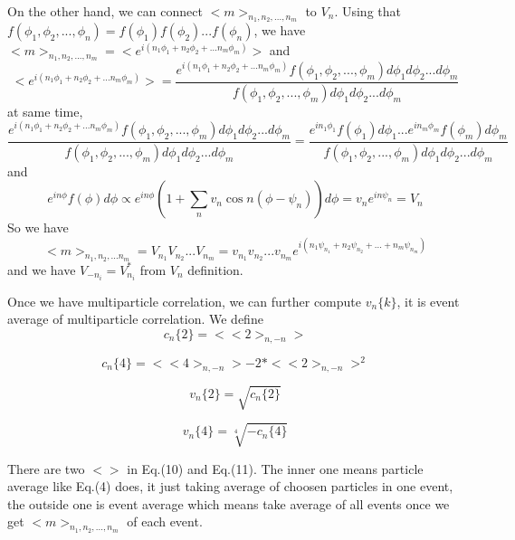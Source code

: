 \documentclass{article}
\begin{document}
\quad On the other hand, we can connect $<m>_{n_1,n_2,...,n_m}$ to $V_n$. Using that $f(\phi_1,\phi_2,...,\phi_n)=f(\phi_1)f(\phi_2)...f(\phi_n)$, we have
$<m>_{n_1,n_2,...,n_m} = <e^{i(n_1 \phi_1+n_2 \phi_2 + ... n_m \phi_m)}>$ and 
\begin{equation}
    <e^{i(n_1 \phi_1+n_2 \phi_2 + ... n_m \phi_m)}> = \frac{e^{i(n_1 \phi_1+n_2 \phi_2 + ... n_m \phi_m)}f(\phi_1,\phi_2,...,\phi_m)d\phi_1 d\phi_2... d\phi_m }{f(\phi_1,\phi_2,...,\phi_m)d\phi_1 d\phi_2... d\phi_m} 
\end{equation}
at same time,
\begin{equation}
    \frac{e^{i(n_1 \phi_1+n_2 \phi_2 + ... n_m \phi_m)}f(\phi_1,\phi_2,...,\phi_m)d\phi_1 d\phi_2... d\phi_m }{f(\phi_1,\phi_2,...,\phi_m)d\phi_1 d\phi_2... d\phi_m} = \frac{e^{in_1 \phi_1}f(\phi_1)d\phi_1 ...e^{in_m \phi_m}f(\phi_m)d\phi_m}{f(\phi_1,\phi_2,...,\phi_m)d\phi_1 d\phi_2... d\phi_m}
\end{equation}
and 
\begin{equation}
    e^{in\phi} f(\phi) d\phi \propto e^{in\phi} (1+\sum_n v_n \cos n(\phi-\psi_n)) d\phi = v_n e^{in\psi_n} = V_n
\end{equation}
So we have 
\begin{equation}
<m>_{n_1,n_2,...n_m} = V_{n_1}V_{n_2}...V_{n_m} = v_{n_1}v_{n_2}...v_{n_m}e^{i(n_1\psi_{n_{1}}+n_2\psi_{n_{2}}+...+n_m\psi_{n_{m}})}
\end{equation}
and we have $V_{-n_{i}}=V_{n_{i}}^{*}$ from $V_n$ definition.

\quad Once we have multiparticle correlation, we can further compute $v_n\{k\}$, it is event average of multiparticle correlation. We define
\begin{equation}
c_n\{2\} = <<2>_{n,-n}>
\end{equation}

\begin{equation}
c_n\{4\} = <<4>_{n,-n}>-2*<<2>_{n,-n}>^{2}
\end{equation}

\begin{equation}
v_n\{2\} = \sqrt{c_n\{2\}}
\end{equation}

\begin{equation}
v_n\{4\} = \sqrt[4]{-c_n\{4 \}}
\end{equation}

\quad There are two $<>$ in Eq.(10) and Eq.(11). The inner one means particle average like Eq.(4) does, it just taking average of choosen particles in one event, the outside one is event average which means take average of all events once we get $<m>_{n_1,n_2,...,n_m}$ of each event. 
\end{document}
